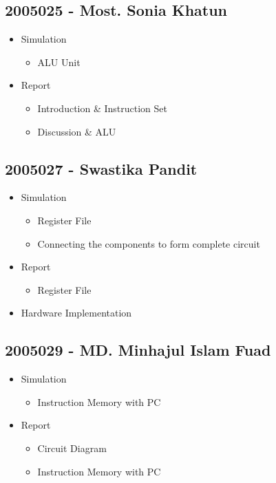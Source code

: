 \documentclass{article}
\begin{document}
\subsection*{2005025 - Most. Sonia Khatun}
    \begin{itemize}
        \item Simulation 
        \begin{itemize}
            \item ALU Unit
        \end{itemize}
        \item Report
        \begin{itemize}
            \item Introduction \& Instruction Set
            \item Discussion \& ALU
        \end{itemize}
    \end{itemize}

\subsection*{2005027 - Swastika Pandit}
\begin{itemize}
    \item Simulation
    \begin{itemize}
        \item Register File
        \item Connecting the components to form complete circuit
    \end{itemize}
    \item Report
    \begin{itemize}
        \item Register File
    \end{itemize}
    \item Hardware Implementation
\end{itemize}

\subsection*{2005029 - MD. Minhajul Islam Fuad}
\begin{itemize}
    \item Simulation
    \begin{itemize}
        \item Instruction Memory with PC
    \end{itemize}
    \item Report
    \begin{itemize}
        \item Circuit Diagram
        \item Instruction Memory with PC
    \end{itemize}    
\end{itemize}
\end{document}
